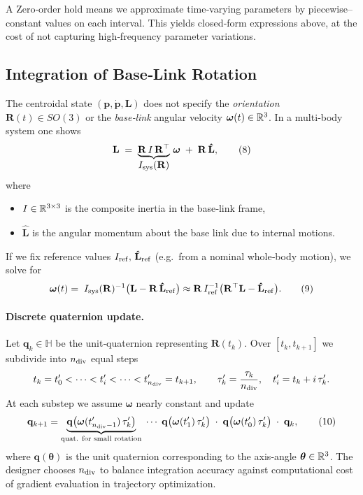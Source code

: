 \documentclass[main.tex]{subfiles}
\begin{document}
\begin{sloppypar}
\medskip
\begin{remark}
A Zero‐order hold means we approximate time‐varying parameters by piecewise–constant values on each interval.  This yields closed‐form expressions above, at the cost of not capturing high‐frequency parameter variations.
\end{remark}

\bigskip
\subsection{Integration of Base‐Link Rotation}

The centroidal state $(\mathbf{p},\dot{\mathbf{p}},\mathbf{L})$ does not specify the \emph{orientation} $\mathbf{R}(t)\in SO(3)$ or the \emph{base‐link} angular velocity $\boldsymbol{\omega}(t)\in\Bbb R^3$.  In a multi‐body system one shows
\[
\mathbf{L} \;=\; \underbrace{\mathbf{R}\,I\,\mathbf{R}^\top}_{\displaystyle I_{\rm sys}(\mathbf{R})}\,\boldsymbol{\omega}
\;+\;\mathbf{R}\,\mathbf{\hat{L}},
\tag{8}
\]
where
\begin{itemize}
  \item $I\in\Bbb R^{3\times3}$ is the composite inertia in the base‐link frame,
  \item $\mathbf{\hat{L}}$ is the angular momentum about the base link due to internal motions.
\end{itemize}
If we fix reference values $I_{\rm ref},\,\mathbf{\hat{L}}_{\rm ref}$ (e.g.\ from a nominal whole‐body motion), we solve for
\[
\boldsymbol{\omega}(t)
= \;I_{\rm sys}(\mathbf{R})^{-1}\bigl(\mathbf{L} - \mathbf{R}\,\mathbf{\hat{L}}_{\rm ref}\bigr)
\approx \mathbf{R}\,I_{\rm ref}^{-1}\bigl(\mathbf{R}^\top \mathbf{L} - \mathbf{\hat{L}}_{\rm ref}\bigr).
\tag{9}
\]

\paragraph{Discrete quaternion update.}
Let $\mathbf{q}_k\in\mathbb{H}$ be the unit‐quaternion representing $\mathbf{R}(t_k)$.
Over $[t_k,t_{k+1}]$ we subdivide into $n_{\rm div}$ equal steps
\[
t_k = t'_0 < \cdots < t'_i < \cdots < t'_{n_{\rm div}} = t_{k+1},\qquad
\tau_k' = \frac{\tau_k}{n_{\rm div}},\quad
t'_i = t_k + i\,\tau_k'.
\]
At each substep we assume $\boldsymbol{\omega}$ nearly constant and update
\[
\mathbf{q}_{k+1}
= \underbrace{\mathbf{q}\bigl(\boldsymbol{\omega}(t'_{n_{\rm div} - 1})\,\tau_k'\bigr)}
_{\text{quat. for small rotation}}
\;\cdots\;
\mathbf{q}\bigl(\boldsymbol{\omega}(t'_1)\,\tau_k'\bigr)\;\cdot\;
\mathbf{q}\bigl(\boldsymbol{\omega}(t'_0)\,\tau_k'\bigr)\;\cdot\;\mathbf{q}_k,
\tag{10}
\]
where $\mathbf{q}(\boldsymbol{\theta})$ is the unit quaternion corresponding to the axis‐angle $\boldsymbol{\theta}\in\Bbb R^3$.  The designer chooses $n_{\rm div}$ to balance integration accuracy against computational cost of gradient evaluation in trajectory optimization.
\end{sloppypar}
\end{document}
